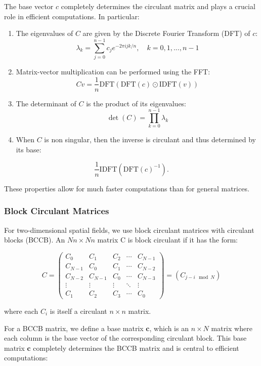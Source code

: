 \documentclass[journal=,manuscript=]{achemso}
\begin{document}
The base vector \(c\) completely determines the circulant matrix and
plays a crucial role in efficient computations. In particular:

\begin{enumerate}
\def\labelenumi{\arabic{enumi}.}
\item
  The eigenvalues of \(C\) are given by the Discrete Fourier Transform
  (DFT) of \(c\): \[
  \lambda_k = \sum_{j=0}^{n-1} c_j e^{-2\pi i jk/n}, \quad k = 0, 1, ..., n-1
  \]
\item
  Matrix-vector multiplication can be performed using the FFT: \[
  Cv = \frac1n\text{DFT}(\text{DFT}(c) \odot \text{IDFT}(v))
  \]
\item
  The determinant of \(C\) is the product of its eigenvalues: \[
  \det(C) = \prod_{k=0}^{n-1} \lambda_k
  \]
\item
  When \(C\) is non singular, then the inverse is circulant and thus
  determined by its base:
\end{enumerate}

\[
\frac1n \text{IDFT}(\text{DFT}(c)^{-1}).
\]

These properties allow for much faster computations than for general
matrices.

\subsubsection{Block Circulant Matrices}\label{block-circulant-matrices}

For two-dimensional spatial fields, we use block circulant matrices with
circulant blocks (BCCB). An \(Nn \times Nn\) matrix C is block circulant
if it has the form:

\[
C = \begin{pmatrix}
C_0 & C_1 & C_2 & \cdots & C_{N-1} \\
C_{N-1} & C_0 & C_1 & \cdots & C_{N-2} \\
C_{N-2} & C_{N-1} & C_0 & \cdots & C_{N-3} \\
\vdots & \vdots & \vdots & \ddots & \vdots \\
C_1 & C_2 & C_3 & \cdots & C_0
\end{pmatrix} = (C_{j-i \mod N})
\]

where each \(C_i\) is itself a circulant \(n \times n\) matrix.

For a BCCB matrix, we define a base matrix \(\mathbf c\), which is an
\(n \times N\) matrix where each column is the base vector of the
corresponding circulant block. This base matrix \(\mathbf c\) completely
determines the BCCB matrix and is central to efficient computations:
\end{document}
